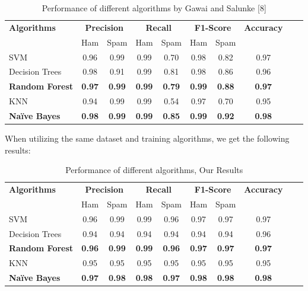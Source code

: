 \documentclass{article}
\begin{document}
\begin{table}[htbp]
    \centering
    \caption{Performance of different algorithms by Gawai and Salunke [8]} %
    \label{tab:performance} %
    
    \begin{tabular}{l cccc cccc c}
    \toprule
    \textbf{Algorithms} & \multicolumn{2}{c}{\textbf{Precision}} & \multicolumn{2}{c}{\textbf{Recall}} & \multicolumn{2}{c}{\textbf{F1-Score}} & \textbf{Accuracy} \\
    \cmidrule(lr){2-3} \cmidrule(lr){4-5} \cmidrule(lr){6-7}
    & Ham & Spam & Ham & Spam & Ham & Spam & \\
    \midrule
    SVM & 0.96 & 0.99 & 0.99 & 0.70 & 0.98 & 0.82 & 0.97 \\
    Decision Trees & 0.98 & 0.91 & 0.99 & 0.81 & 0.98 & 0.86 & 0.96 \\
    \textbf{Random Forest} & \textbf{0.97} & \textbf{0.99} & \textbf{0.99} & \textbf{0.79} & \textbf{0.99} & \textbf{0.88} & \textbf{0.97} \\
    KNN & 0.94 & 0.99 & 0.99 & 0.54 & 0.97 & 0.70 & 0.95 \\
    \textbf{Naïve Bayes} & \textbf{0.98} & \textbf{0.99} & \textbf{0.99} & \textbf{0.85} & \textbf{0.99} & \textbf{0.92} & \textbf{0.98} \\
    \bottomrule
    \end{tabular}
\end{table}

\noindent
When utilizing the same dataset and training algorithms, we get the following results:

\begin{table}[htbp]
    \centering
    \caption{Performance of different algorithms, Our Results} %
    \label{tab:performance} %
    
    \begin{tabular}{l cccc cccc c}
    \toprule
    \textbf{Algorithms} & \multicolumn{2}{c}{\textbf{Precision}} & \multicolumn{2}{c}{\textbf{Recall}} & \multicolumn{2}{c}{\textbf{F1-Score}} & \textbf{Accuracy} \\
    \cmidrule(lr){2-3} \cmidrule(lr){4-5} \cmidrule(lr){6-7}
    & Ham & Spam & Ham & Spam & Ham & Spam & \\
    \midrule
    SVM & 0.96 & 0.99 & 0.99 & 0.96 & 0.97 & 0.97 & 0.97 \\
    Decision Trees & 0.94 & 0.94 & 0.94 & 0.94 & 0.94 & 0.94 & 0.96 \\
    \textbf{Random Forest} & \textbf{0.96} & \textbf{0.99} & \textbf{0.99} & \textbf{0.96} & \textbf{0.97} & \textbf{0.97} & \textbf{0.97} \\
    KNN & 0.95 & 0.95 & 0.95 & 0.95 & 0.95 & 0.95 & 0.95 \\
    \textbf{Naïve Bayes} & \textbf{0.97} & \textbf{0.98} & \textbf{0.98} & \textbf{0.97} & \textbf{0.98} & \textbf{0.98} & \textbf{0.98} \\
    \bottomrule
    \end{tabular}
\end{table}
\end{document}
